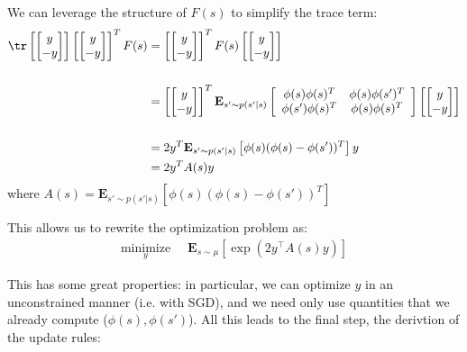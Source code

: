 \documentclass[11pt]{article}
\begin{document}
We can leverage the structure of $F(s)$ to simplify the trace term:
\begin{align}
\tr  \left [ \begin{bmatrix} y \\ -y \end{bmatrix} \right ] \left [ \begin{bmatrix} y \\ -y \end{bmatrix} \right ]^T F(s)
    & = \left [ \begin{bmatrix} y \\ -y \end{bmatrix} \right ]^T F(s) \left [ \begin{bmatrix} y \\ -y \end{bmatrix} \right ] \\
\\  & =  \left [ \begin{bmatrix} y \\ -y \end{bmatrix} \right ]^T  \mathbf{E}_{s' \sim p(s'|s)}  \left[ \begin{array}{cc} \phi(s)\phi(s)^T & \phi(s)\phi(s')^T \\ \phi(s')\phi(s)^T & \phi(s)\phi(s)^T \end{array} \right]
 \left [ \begin{bmatrix} y \\ -y \end{bmatrix} \right ] \\
\\  & =  2 y^T \mathbf{E}_{s' \sim p(s'|s)} \left [\phi(s)(\phi(s)- \phi(s'))^T \right ] y
\\  & =  2 y^T A(s) y
\end{align}
where $A(s) = \mathbf{E}_{s' \sim p(s'|s)} \left [\phi(s)(\phi(s)- \phi(s'))^T \right ]$

This allows us to rewrite the optimization problem as:
\begin{align}
  \underset{y}{\text{minimize}} & \;\; \mathbf{E}_{s\sim\mu} \left [ \exp\left(2 y^\top A(s) y \right)  \right ]
\end{align}

This has some great properties: in particular, we can optimize $y$ in an unconstrained manner (i.e. with SGD), and we need only use quantities that we already compute ($\phi(s), \phi(s')$). All this leads to the final step, the derivtion of the update rules:
\end{document}
